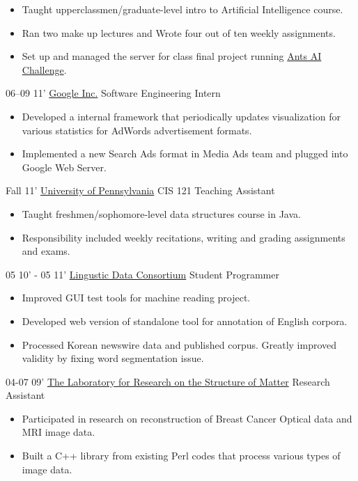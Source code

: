 \documentclass[]{patyoon-cv}
\begin{document}
\begin{entrylist}
{\begin{itemize}
        \item Taught upperclassmen/graduate-level intro to Artificial Intelligence course.
        \item Ran two make up lectures and Wrote four out of ten weekly assignments. 
        \item Set up and managed the server for class final project running \href{http://aichallenge.org/}{Ants AI Challenge}.
    \end{itemize}} 
  \entry
    {06–09 11'}
    {\href{http://www.google.com}{Google Inc.}}
    {Software Engineering Intern}
    {\begin{itemize}
      \item Developed a internal framework that periodically updates visualization for various statistics for AdWords advertisement formats.
      \item Implemented a new Search Ads format in Media Ads team and plugged into Google Web Server.
      \end{itemize}} 
  \entry
      {Fall 11'}
      {\href{http://www.cis.upenn.edu/}{University of Pennsylvania}}
      {CIS 121 Teaching Assistant}
      {\begin{itemize}
        \item Taught freshmen/sophomore-level data structures course in Java.
        \item Responsibility included weekly recitations, writing and grading assignments and exams.
      \end{itemize}} 
\end{entrylist}

\begin{entrylist}
    \entry
      {05 10' - 05 11'}
      {\href{http://www.ldc.upenn.edu/}{Lingustic Data Consortium}}
      {Student Programmer}
      {\begin{itemize}
        \item Improved GUI test tools for machine reading project.
        \item Developed web version of standalone tool for annotation of English corpora. 
        \item Processed Korean newswire data and published corpus. Greatly improved validity by fixing word segmentation issue. 
      \end{itemize}} 
  \entry
      {04-07 09'}
      {\href{http://www.lrsm.upenn.edu/}{The Laboratory for Research on the Structure of Matter}}
      {Research Assistant}
      {\begin{itemize}
        \item Participated in research on reconstruction of Breast Cancer Optical data and MRI image data.
        \item Built a C++ library from existing Perl codes that process various types of image data.
    \end{itemize}}   
\end{entrylist}
      
\end{document}
